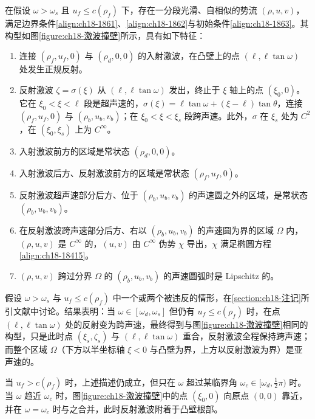 \documentclass[../../main.tex]{subfiles}
\begin{document}
\begin{theorem}[激波绕凸壁的衍射]\label{theorem:ch18-激波绕凸壁衍射}
在假设 $\omega>\omega_s$ 且 $u_f\leqslant c(\rho_f)$ 下，存在一分段光滑、自相似的势流 $(\rho,u,v)$，满足边界条件\eqref{align:ch18-1861}、\eqref{align:ch18-1862}与初始条件\eqref{align:ch18-1863}。其构型如图\cref{figure:ch18-激波撞壁}所示，具有如下特征：
\begin{enumerate}
\item\label{item:ch18-衍射-a} 连接 $(\rho_f,u_f,0)$ 与 $(\rho_d,0,0)$ 的入射激波，在凸壁上的点 $(\ell,\ell\tan\omega)$ 处发生正规反射。
\item\label{item:ch18-衍射-b} 反射激波 $\zeta=\sigma(\xi)$ 从 $(\ell,\ell\tan\omega)$ 发出，终止于 $\xi$ 轴上的点 $(\xi_0,0)$。它在 $\xi_0<\xi<\ell$ 段是超声速的，$\sigma(\xi)=\ell\tan\omega+(\xi-\ell)\tan\theta$，连接 $(\rho_f,u_f,0)$ 与 $(\rho_b,u_b,v_b)$；在 $\xi_0<\xi<\xi_s$ 段跨声速。此外，$\sigma$ 在 $\xi_s$ 处为 $C^2$，在 $(\xi_0,\xi_s)$ 上为 $C^\infty$。
\item\label{item:ch18-衍射-c} 入射激波前方的区域是常状态 $(\rho_d,0,0)$。
\item\label{item:ch18-衍射-d} 入射激波后方、反射激波前方的区域是常状态 $(\rho_f,u_f,0)$。
\item\label{item:ch18-衍射-e} 反射激波超声速部分后方、位于 $(\rho_b,u_b,v_b)$ 的声速圆之外的区域，是常状态 $(\rho_b,u_b,v_b)$。
\item\label{item:ch18-衍射-f} 在反射激波跨声速部分后方、右以 $(\rho_b,u_b,v_b)$ 的声速圆为界的区域 $\Omega$ 内，$(\rho,u,v)$ 是 $C^\infty$ 的，$(u,v)$ 由 $C^\infty$ 伪势 $\chi$ 导出，$\chi$ 满足椭圆方程\eqref{align:ch18-18415}。
\item\label{item:ch18-衍射-g} $(\rho,u,v)$ 跨过分界 $\Omega$ 的 $(\rho_b,u_b,v_b)$ 的声速圆弧时是 Lipschitz 的。
\end{enumerate}
\end{theorem}

假设 $\omega>\omega_s$ 与 $u_f\leqslant c(\rho_f)$ 中一个或两个被违反的情形，在\cref{section:ch18-注记}所引文献中讨论。结果表明：当 $\omega\in[\omega_d,\omega_s]$ 但仍有 $u_f\leqslant c(\rho_f)$ 时，在点 $(\ell,\ell\tan\omega)$ 处的反射变为跨声速，最终得到与图\cref{figure:ch18-激波撞壁}相同的构型，只是此时点 $(\xi_s,\zeta_s)$ 与 $(\ell,\ell\tan\omega)$ 重合，反射激波全程保持跨声速；而整个区域 $\Omega$（下方以半坐标轴 $\xi<0$ 与凸壁为界，上方以反射激波为界）是亚声速的。

当 $u_f>c(\rho_f)$ 时，上述描述仍成立，但只在 $\omega$ 超过某临界角 $\omega_c\in[\omega_d,\frac12\pi)$ 时。当 $\omega$ 趋近 $\omega_c$ 时，图\cref{figure:ch18-激波撞壁}中的点 $(\xi_0,0)$ 向原点 $(0,0)$ 靠近，并在 $\omega=\omega_c$ 时与之合并，此时反射激波附着于凸壁根部。
\end{document}
